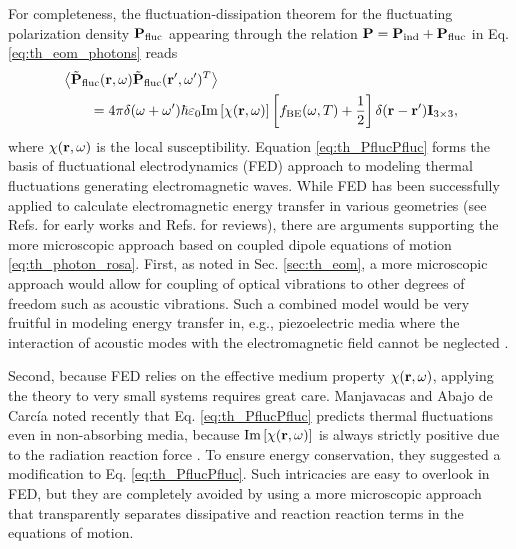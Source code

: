 For completeness, the fluctuation-dissipation theorem for the fluctuating polarization density $\mathbf{P}_{\textrm{fluc}}$ appearing through the relation $\mathbf{P}=\mathbf{P}_{\textrm{ind}}+\mathbf{P}_{\textrm{fluc}}$ in Eq. \eqref{eq:th_eom_photons} reads \cite{novotny}
\begin{alignat}{2}
 & \left\langle \tilde{\mathbf{P}}_{\textrm{fluc}}(\mathbf{r},\omega) \tilde{\mathbf{P}}_{\textrm{fluc}}(\mathbf{r}',\omega')^T\right\rangle \notag \\
 &\qquad = 4\pi \delta(\omega+\omega') \hbar \varepsilon_0 \textrm{Im}\left[ \chi(\mathbf{r},\omega)\right] \left[f_{\textrm{BE}}(\omega,T)+\frac{1}{2}\right] \delta(\mathbf{r}-\mathbf{r}') \mathbf{I}_{3 \times 3}, \label{eq:th_PflucPfluc}
\end{alignat}
where $\chi(\mathbf{r},\omega)$ is the local susceptibility. Equation \eqref{eq:th_PflucPfluc} forms the basis of fluctuational electrodynamics \cite{rytov,lifshitz55} (FED) approach to modeling thermal fluctuations generating electromagnetic waves. While FED has been successfully applied to calculate electromagnetic energy transfer in various geometries (see Refs. \cite{polder71,loomis94,pendry99,volokitin01} for early works and Refs. \cite{joulain05,volokitin07} for reviews), there are arguments supporting the more microscopic approach based on coupled dipole equations of motion \eqref{eq:th_photon_rosa}. First, as noted in Sec. \ref{sec:th_eom}, a more microscopic approach would allow for coupling of optical vibrations to other degrees of freedom such as acoustic vibrations. Such a combined model would be very fruitful in modeling energy transfer in, e.g., piezoelectric media where the interaction of acoustic modes with the electromagnetic field cannot be neglected \cite{prunnila10}. 

Second, because FED relies on the effective medium property $\chi(\mathbf{r},\omega)$, applying the theory to very small systems requires great care. Manjavacas and Abajo de Carc\'ia \cite{manjavacas12} noted recently that Eq. \eqref{eq:th_PflucPfluc} predicts thermal fluctuations even in non-absorbing media, because $\textrm{Im}\left[ \chi(\mathbf{r},\omega)\right]$ is always strictly positive due to the radiation reaction force \cite{jackson}. To ensure energy conservation, they suggested a modification to Eq. \eqref{eq:th_PflucPfluc}. Such intricacies are easy to overlook in FED, but they are completely avoided by using a more microscopic approach that transparently separates dissipative and reaction reaction terms in the equations of motion.



